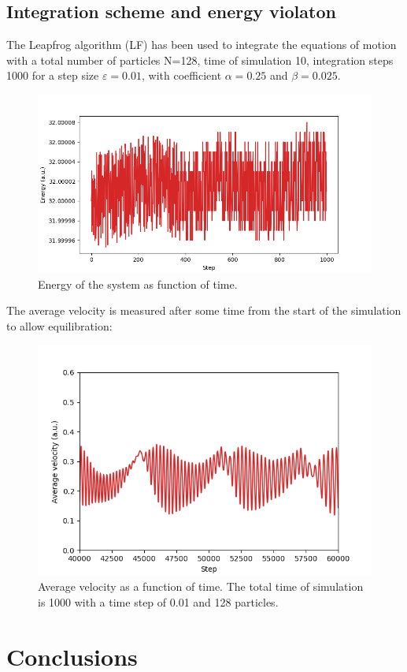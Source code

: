 \documentclass[12pt,a4paper,twocolumn]{article}
\begin{document}
\subsection{Integration scheme and energy violaton}
The Leapfrog algorithm (LF) has been used to integrate the equations of motion with a total number of particles N=128, time of simulation 10, integration steps 1000 for a step size $\varepsilon=0.01$, with coefficient $\alpha=0.25$ and $\beta=0.025$.
\begin{figure}[h!]
\includegraphics[width=\linewidth]{Figure_1.png}	
\caption{Energy of the system as function of time.}
\end{figure}
The average velocity is measured after some time from the start of the simulation to allow equilibration:
\begin{figure}[h!]
	\includegraphics[width=\linewidth]{Figure_2.png}	
	\caption{Average velocity as a function of time. The total time of simulation is 1000 with a time step of 0.01 and 128 particles. }
\end{figure}

\section{Conclusions}
\end{document}
